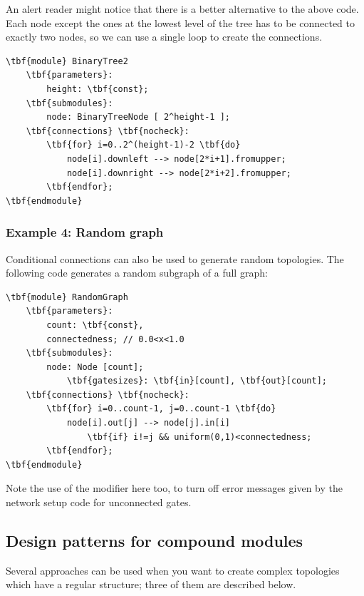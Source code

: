 An alert reader might notice that there is a better alternative
to the above code. Each node except the ones at the lowest level
of the tree has to be connected to exactly two nodes,
so we can use a single loop to create the connections.

\begin{Verbatim}[commandchars=\\\{\}]
\tbf{module} BinaryTree2
    \tbf{parameters}:
        height: \tbf{const};
    \tbf{submodules}:
        node: BinaryTreeNode [ 2^height-1 ];
    \tbf{connections} \tbf{nocheck}:
        \tbf{for} i=0..2^(height-1)-2 \tbf{do}
            node[i].downleft --> node[2*i+1].fromupper;
            node[i].downright --> node[2*i+2].fromupper;
        \tbf{endfor};
\tbf{endmodule}
\end{Verbatim}



\subsubsection{Example 4: Random graph}

Conditional connections can also be used to generate random
topologies.  The following code generates a
random subgraph of a full graph:

\begin{Verbatim}[commandchars=\\\{\}]
\tbf{module} RandomGraph
    \tbf{parameters}:
        count: \tbf{const},
        connectedness; // 0.0<x<1.0
    \tbf{submodules}:
        node: Node [count];
            \tbf{gatesizes}: \tbf{in}[count], \tbf{out}[count];
    \tbf{connections} \tbf{nocheck}:
        \tbf{for} i=0..count-1, j=0..count-1 \tbf{do}
            node[i].out[j] --> node[j].in[i]
                \tbf{if} i!=j && uniform(0,1)<connectedness;
        \tbf{endfor};
\tbf{endmodule}
\end{Verbatim}

Note the use of the  modifier
here too, to turn off error messages given by the network setup code
for unconnected gates.


\subsection{Design patterns for compound modules}


Several approaches can be used when you want to create complex
topologies which have a regular structure; three of them are
described below.


